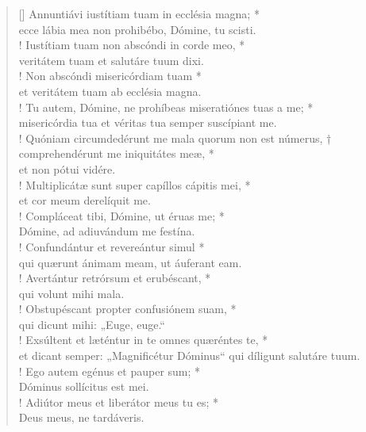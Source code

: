 \begin{verse}[\versewidth]
Annuntiávi iustítiam tuam in ecclésia magna; *\\
ecce lábia mea non prohibébo, Dómine, tu scisti.\\!
\vin Iustítiam tuam non abscóndi in corde meo, *\\
\vin veritátem tuam et salutáre tuum dixi.\\!
Non abscóndi misericórdiam tuam *\\
et veritátem tuam ab ecclésia magna.\\!
\vin Tu autem, Dómine, ne prohíbeas miseratiónes tuas a me; *\\
\vin misericórdia tua et véritas tua semper suscípiant me.\\!
Quóniam circumdedérunt me mala quorum non est númerus, †\\
comprehendérunt me iniquitátes meæ, *\\
et non pótui vidére.\\!
\vin Multiplicátæ sunt super capíllos cápitis mei, *\\
\vin et cor meum derelíquit me.\\!
Compláceat tibi, Dómine, ut éruas me; *\\
Dómine, ad adiuvándum me festína.\\!
\vin Confundántur et revereántur simul *\\
\vin qui quærunt ánimam meam, ut áuferant eam.\\!
Avertántur retrórsum et erubéscant, *\\
qui volunt mihi mala.\\!
\vin Obstupéscant propter confusiónem suam, *\\
\vin qui dicunt mihi: „Euge, euge.“\\!
Exsúltent et læténtur in te omnes quæréntes te, *\\
et dicant semper: „Magnificétur Dóminus“ qui díligunt salutáre tuum.\\!
\vin Ego autem egénus et pauper sum; *\\
\vin Dóminus sollícitus est mei.\\!
Adiútor meus et liberátor meus tu es; *\\
Deus meus, ne tardáveris.\\
\end{verse}
\vspace{1cm}


